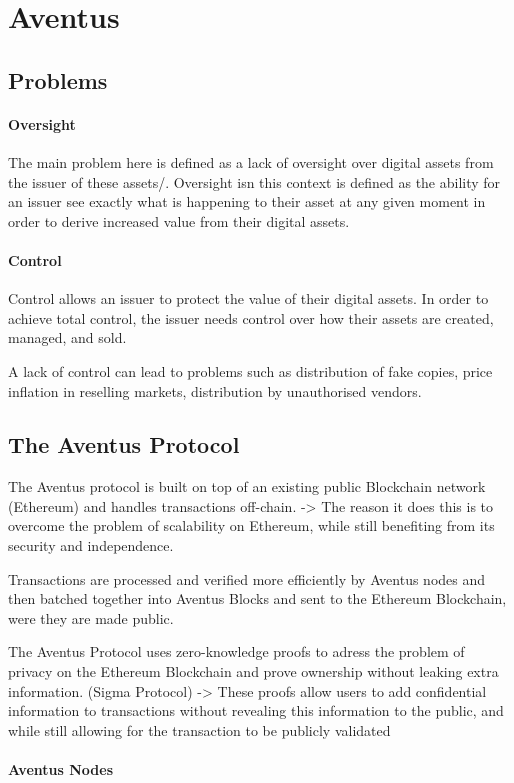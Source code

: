 
\section{Aventus}

\subsection{Problems}
\paragraph{Oversight}

The main problem here is defined as a lack of oversight over digital assets from the issuer of these assets/. Oversight isn this context is defined as the ability for an issuer see exactly what is happening to their asset at any given moment in order to derive increased value from their digital assets.

\paragraph{Control}

Control allows an issuer to protect the value of their digital assets. In order to achieve total control, the issuer needs control over how their assets are created, managed, and sold.

A lack of control can lead to problems such as distribution of fake copies, price inflation in reselling markets, distribution by unauthorised vendors.

\subsection{The Aventus Protocol}

The Aventus protocol is built on top of an existing public Blockchain network (Ethereum) and handles transactions off-chain.
-> The reason it does this is to overcome the problem of scalability on Ethereum, while still benefiting from its security and independence.

Transactions are processed and verified more efficiently by Aventus nodes and then batched together into Aventus Blocks and sent to the Ethereum Blockchain, were they are made public.

The Aventus Protocol uses zero-knowledge proofs to adress the problem of privacy on the Ethereum Blockchain and prove ownership without leaking extra information. (Sigma Protocol)
-> These proofs allow users to add confidential information to transactions without revealing this information to the public, and while still allowing for the transaction to be publicly validated


\paragraph{Aventus Nodes}



